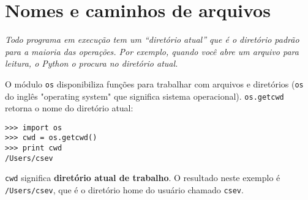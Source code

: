 \section{Nomes e caminhos de arquivos}
\label{paths}


{\it Todo programa em execução tem um ``diretório atual'' que é o diretório padrão para a maioria das operações. Por exemplo, quando você abre um arquivo para leitura, o Python o procura no diretório atual.}


O módulo {\tt os} disponibiliza funções para trabalhar com arquivos e diretórios ({\tt os} do inglês "operating system" que significa sistema operacional).  
{\tt os.getcwd} retorna o nome do diretório atual:


\beforeverb
\begin{verbatim}
>>> import os
>>> cwd = os.getcwd()
>>> print cwd
/Users/csev
\end{verbatim}
\afterverb
%
{\tt cwd} significa {\bf diretório atual de trabalho}. O resultado neste exemplo é 
{\tt /Users/csev}, que é o diretório home do usuário chamado {\tt csev}.


